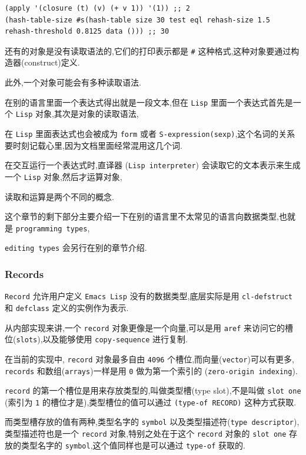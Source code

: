 \documentclass[11pt]{article}
\begin{document}
\begin{verbatim}
(apply '(closure (t) (v) (+ v 1)) '(1)) ;; 2
(hash-table-size #s(hash-table size 30 test eql rehash-size 1.5 rehash-threshold 0.8125 data ())) ;; 30
\end{verbatim}

还有的对象是没有读取语法的,它们的打印表示都是 \texttt{\#< xxxxxx >} 这种格式,这种对象要通过构造器(construct)定义.

此外,一个对象可能会有多种读取语法.

在别的语言里面一个表达式得出就是一段文本,但在 \texttt{Lisp} 里面一个表达式首先是一个 \texttt{Lisp} 对象,其次是对象的读取语法,

在 \texttt{Lisp} 里面表达式也会被成为 \texttt{form} 或者 \texttt{S-expression(sexp)},这个名词的关系要时刻记载心里,因为文档里面经常混用这几个词.

在交互运行一个表达式时,直译器 (\texttt{Lisp interpreter}) 会读取它的文本表示来生成一个 \texttt{Lisp} 对象,然后才运算对象,

读取和运算是两个不同的概念.

这个章节的剩下部分主要介绍一下在别的语言里不太常见的语言向数据类型,也就是 \texttt{programming types},

\texttt{editing types} 会另行在别的章节介绍.

\subsubsection{Records}
\label{sec:org4196448}

\texttt{Record} 允许用户定义 \texttt{Emacs Lisp} 没有的数据类型,底层实际是用 \texttt{cl-defstruct} 和 \texttt{defclass} 定义的实例作为表示.

从内部实现来讲,一个 \texttt{record} 对象更像是一个向量,可以是用 \texttt{aref} 来访问它的槽位(\texttt{slots}),以及能够使用 \texttt{copy-sequence} 进行复制.

在当前的实现中, \texttt{record} 对象最多自由 \texttt{4096} 个槽位,而向量(\texttt{vector})可以有更多, \texttt{records} 和数组(\texttt{arrays})一样是用 \texttt{0} 做为第一个索引的 (\texttt{zero-origin indexing}).

\texttt{record} 的第一个槽位是用来存放类型的,叫做类型槽(type slot),不是叫做 \texttt{slot one} (索引为 \texttt{1} 的槽位才是),类型槽位的值可以通过 \texttt{(type-of RECORD)} 这种方式获取.

而类型槽存放的值有两种,类型名字的 \texttt{symbol} 以及类型描述符(\texttt{type descriptor}),类型描述符也是一个 \texttt{record} 对象,特别之处在于这个 \texttt{record} 对象的 \texttt{slot one} 存放的类型名字的 \texttt{symbol},这个值同样也是可以通过 \texttt{type-of} 获取的.
\end{document}
